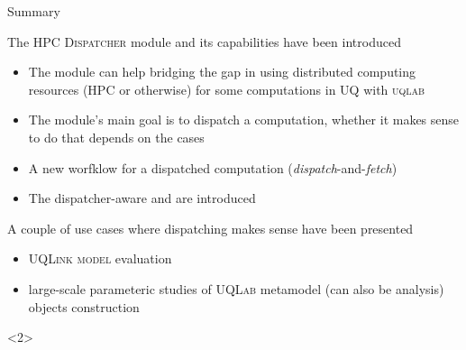 \documentclass[]{rsuqbeamernew}
\begin{document}
\begin{frame}[fragile]{Summary}

\begin{block}{The HPC \textsc{Dispatcher} module and its capabilities have been introduced}
\begin{itemize}
  \item The module can help bridging the gap in using distributed computing resources (HPC or otherwise)
        for some computations in UQ with \textsc{uqlab}
  \item The module's main goal is to {\altx dispatch} a computation,
        whether it makes sense to do that depends on the cases
  \item A new worfklow for a dispatched computation (\emph{dispatch}-and-\emph{fetch})
  \item The {\altx dispatcher-aware}  and  are introduced
\end{itemize}  
\end{block}

\begin{block}{A couple of use cases where dispatching makes sense have been presented}
\begin{itemize}
  \item \textsc{UQLink} \textsc{model} evaluation
  \item large-scale parameteric studies of \textsc{UQLab} metamodel (can also be analysis) objects
        construction
\end{itemize}
\end{block}

\begin{onlyenv}<2>
\end{onlyenv}

\end{frame}
  
\end{document}
